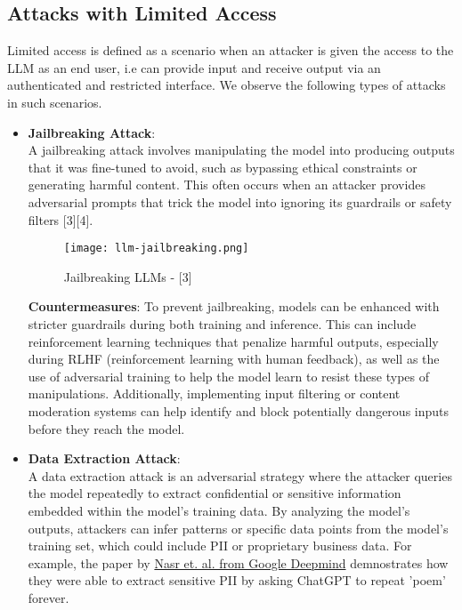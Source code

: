 \documentclass[12pt]{article}
\begin{document}
    \subsection{Attacks with Limited Access}
    Limited access is defined as a scenario when an attacker is given the access to the LLM as an end user, i.e can provide input and receive output via an authenticated and restricted interface. We observe the following types of attacks in such scenarios.
    \begin{itemize}
        \item \textbf{Jailbreaking Attack}: \\
        A jailbreaking attack involves manipulating the model into producing outputs that it was fine-tuned to avoid, such as bypassing ethical constraints or generating harmful content. This often occurs when an attacker provides adversarial prompts that trick the model into ignoring its guardrails or safety filters [3][4].
        \begin{figure}[ht!]
            \centering
            \texttt{[image: llm-jailbreaking.png]}
            \caption{Jailbreaking LLMs - [3]}
            \label{fig:jailbreaking-llms}
        \end{figure}

        \textbf{Countermeasures}: To prevent jailbreaking, models can be enhanced with stricter guardrails during both training and inference. This can include reinforcement learning techniques that penalize harmful outputs, especially during RLHF (reinforcement learning with human feedback), as well as the use of adversarial training to help the model learn to resist these types of manipulations. Additionally, implementing input filtering or content moderation systems can help identify and block potentially dangerous inputs before they reach the model. \\

        \item \textbf{Data Extraction Attack}: \\
        A data extraction attack is an adversarial strategy where the attacker queries the model repeatedly to extract confidential or sensitive information embedded within the model’s training data. By analyzing the model's outputs, attackers can infer patterns or specific data points from the model’s training set, which could include PII or proprietary business data. For example, the paper by \href{https://arxiv.org/pdf/2311.17035}{Nasr et. al. from Google Deepmind} demnostrates how they were able to extract sensitive PII by asking ChatGPT to repeat 'poem' forever.


\end{itemize}
\end{document}
